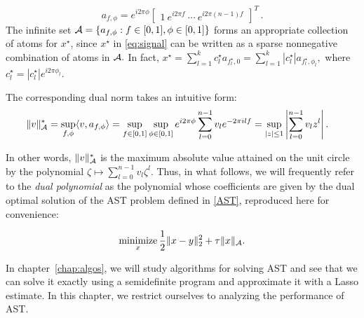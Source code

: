 \begin{equation}
\label{eq:trig-atoms} a_{f,\phi} = e^{i2\pi \phi}\begin{bmatrix}1 ~ e^{i2\pi f} ~
\cdots ~ e^{i2\pi(n-1)f} \end{bmatrix}^T\,.
\end{equation}
The  infinite set $\mathcal{A} = \{ a_{f,\phi}: f \in
[0,1], \phi \in [0,1] \}$ forms an appropriate collection of atoms for
$x^\star$, since $x^\star$ in \eqref{eq:signal} can be written as a sparse
nonnegative combination of atoms in $\mathcal{A}.$ In fact, $x^\star = \sum_{l = 1}^k
c_l^\star a_{f_l^\star,0} = \sum_{l = 1}^k |c_l^\star| a_{f_l^\star,\phi_l},$
where $c_l^\star = |c_l^\star|e^{i2\pi\phi_l}.$

The corresponding dual norm takes an intuitive form:
\begin{align}
	\|v\|_{\mathcal{A}}^* &= \sup_{{f,\phi}} \langle v, a_{f,\phi} \rangle=\sup_{f\in [0,1]}  \sup_{\phi \in [0,1]}  e^{i 2\pi \phi} \sum_{l=0}^{n-1} v_l e^{-2\pi i l f} =\sup_{ |z|\leq 1 }  \left| \sum_{l=0}^{n-1} v_l z^l\right|.\label{eq:dual-norm-poly}
\end{align}

In other words, $\|v\|_{\mathcal{A}}^*$ is the maximum absolute value attained on the
unit circle by the polynomial $\zeta \mapsto \sum_{l=0}^{n-1} v_l \zeta^l$.
Thus, in what follows, we will frequently refer to the \emph{dual polynomial} as
the polynomial whose coefficients are given by the dual optimal solution of the
AST problem defined in \eqref{AST}, reproduced here for convenience:

\begin{equation}
\label{eq:linespect:ast}
\mathop{\textrm{minimize}}_x \frac{1}{2} \lVert x - y\rVert_2^2 + \tau \lVert x\rVert_{\mathcal{A}}.
\end{equation}

In chapter~\ref{chap:algos}, we will study algorithms for solving AST and see that we can solve it exactly using a semidefinite program and approximate it with a Lasso estimate. In this chapter, we restrict ourselves to analyzing the performance of AST.

